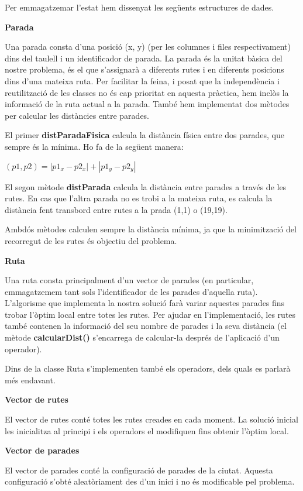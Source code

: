 Per emmagatzemar l'estat hem dissenyat les següents estructures de dades.

\textbf{Parada}

Una parada consta d'una posició (x, y) (per les columnes i files respectivament) dins del taulell i un identificador de parada. La parada és la unitat bàsica del nostre problema, és el que s'assignarà a diferents rutes i en diferents posicions dins d'una mateixa ruta. Per facilitar la feina, i posat que la independència i reutilització de les classes no és cap prioritat en aquesta pràctica, hem inclòs la informació de la ruta actual a la parada. També hem implementat dos mètodes per calcular les distàncies entre parades. 

El primer \textbf{distParadaFisica} calcula la distància física entre dos parades, que sempre és la mínima. Ho fa de la següent manera:

\begin{center}
$(p1,p2)=|p1_{x} - p2_{x}|+|p1_{y} - p2_{y}|$ 
\end{center}

El segon mètode \textbf{distParada} calcula la distància entre parades a través de les rutes. En cas que l'altra parada no es trobi a la mateixa ruta, es calcula la distància fent transbord entre rutes a la prada (1,1) o (19,19).

Ambdós mètodes calculen sempre la distància mínima, ja que la minimització del recorregut de les rutes és objectiu del problema.

\textbf{Ruta}

Una ruta consta principalment d'un vector de parades (en particular, emmagatzemem tant sols l'identificador de les parades d'aquella ruta). L'algorisme que implementa la nostra solució farà variar aquestes parades fins trobar l'òptim local entre totes les rutes. Per ajudar en l'implementació, les rutes també contenen la informació del seu nombre de parades i la seva distància (el mètode \textbf{calcularDist()} s'encarrega de calcular-la després de l'aplicació d'un operador).

Dins de la classe Ruta s'implementen també els operadors, dels quals es parlarà més endavant.

\textbf{Vector de rutes}

El vector de rutes conté totes les rutes creades en cada moment. La solució inicial les inicialitza al principi i els operadors el modifiquen fins obtenir l'òptim local.

\textbf{Vector de parades}

El vector de parades conté la configuració de parades de la ciutat. Aquesta configuració s'obté aleatòriament des d'un inici i no és modificable pel problema.

